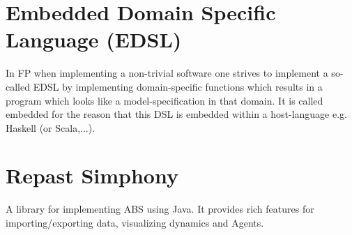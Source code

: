 \documentclass[oneside]{book}
\begin{document}
\section*{Embedded Domain Specific Language (EDSL)}
In FP when implementing a non-trivial software one strives to implement a so-called EDSL by implementing domain-specific functions which results in a program which looks like a model-specification in that domain. It is called embedded for the reason that this DSL is embedded within a host-language e.g. Haskell (or Scala,...).

\section*{Repast Simphony}
A library for implementing ABS using Java. It provides rich features for importing/exporting data, visualizing dynamics and Agents.

\begin{landscape}


\end{landscape}
\end{document}
